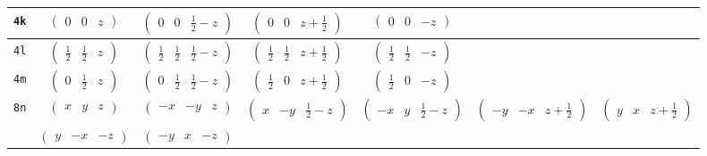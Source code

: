 \documentclass[fleqn,9pt,landscape]{jsarticle}
\begin{document}
\begin{center}
\begin{longtable}{ccccccc}
{\tt 4k} & $ \begin{pmatrix} 0 & 0 & z \end{pmatrix} $ & $ \begin{pmatrix} 0 & 0 & \frac{1}{2} - z \end{pmatrix} $ & $ \begin{pmatrix} 0 & 0 & z + \frac{1}{2} \end{pmatrix} $ & $ \begin{pmatrix} 0 & 0 & - z \end{pmatrix} $ & $  $ & $  $ \\ \hline
{\tt 4l} & $ \begin{pmatrix} \frac{1}{2} & \frac{1}{2} & z \end{pmatrix} $ & $ \begin{pmatrix} \frac{1}{2} & \frac{1}{2} & \frac{1}{2} - z \end{pmatrix} $ & $ \begin{pmatrix} \frac{1}{2} & \frac{1}{2} & z + \frac{1}{2} \end{pmatrix} $ & $ \begin{pmatrix} \frac{1}{2} & \frac{1}{2} & - z \end{pmatrix} $ & $  $ & $  $ \\ \hline
{\tt 4m} & $ \begin{pmatrix} 0 & \frac{1}{2} & z \end{pmatrix} $ & $ \begin{pmatrix} 0 & \frac{1}{2} & \frac{1}{2} - z \end{pmatrix} $ & $ \begin{pmatrix} \frac{1}{2} & 0 & z + \frac{1}{2} \end{pmatrix} $ & $ \begin{pmatrix} \frac{1}{2} & 0 & - z \end{pmatrix} $ & $  $ & $  $ \\ \hline
{\tt 8n} & $ \begin{pmatrix} x & y & z \end{pmatrix} $ & $ \begin{pmatrix} - x & - y & z \end{pmatrix} $ & $ \begin{pmatrix} x & - y & \frac{1}{2} - z \end{pmatrix} $ & $ \begin{pmatrix} - x & y & \frac{1}{2} - z \end{pmatrix} $ & $ \begin{pmatrix} - y & - x & z + \frac{1}{2} \end{pmatrix} $ & $ \begin{pmatrix} y & x & z + \frac{1}{2} \end{pmatrix} $ \\
& $ \begin{pmatrix} y & - x & - z \end{pmatrix} $ & $ \begin{pmatrix} - y & x & - z \end{pmatrix} $ & $  $ & $  $ & $  $ & $  $ \\
\end{longtable}
\end{center}
\end{document}
